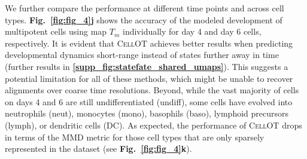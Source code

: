 We further compare the performance at different time points and across cell types.
\textbf{Fig.~\ref{fig:fig_4}j} shows the accuracy of the modeled development of multipotent cells using map $T_m$ individually for day 4 and day 6 cells, respectively. It is evident that \textsc{CellOT} achieves better results when predicting developmental dynamics short-range instead of states further away in time (further results in \textbf{\ref{supp_fig:statefate_shared_umaps}}).
This suggests a potential limitation for all of these methods, which might be unable to recover alignments over coarse time resolutions.
Beyond, while the vast majority of cells on days 4 and 6 are still undifferentiated (undiff), some cells have evolved into neutrophils (neut), monocytes (mono), basophils (baso), lymphoid precursors (lymph), or dendritic cells (DC).
As expected, the performance of \textsc{CellOT} drops in terms of the MMD metric for those cell types that are only sparsely represented in the dataset (see \textbf{Fig.~\ref{fig:fig_4}k}).
